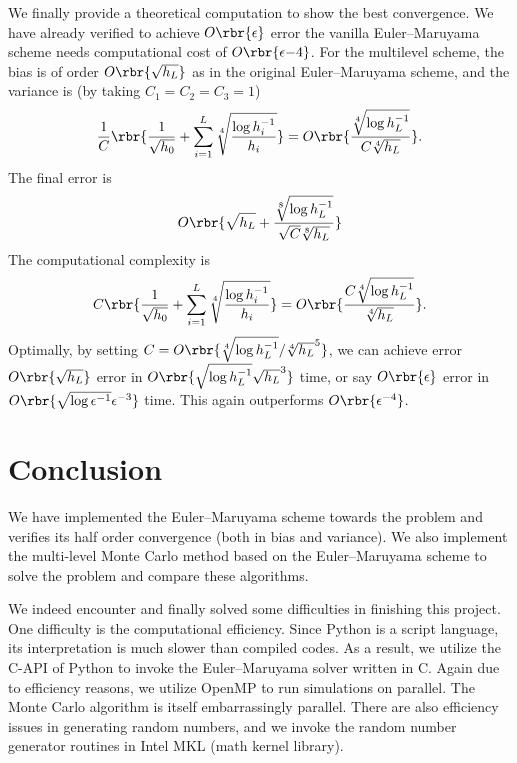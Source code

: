 \documentclass[english, nochinese]{pnote}
\begin{document}
We finally provide a theoretical computation to show the best convergence. We have already verified to achieve $ O \rbr{\epsilon} $ error the vanilla Euler--Maruyama scheme needs computational cost of $ O \rbr{\epsilon{-4}} $. For the multilevel scheme, the bias is of order $ O \rbr{\sqrt{h_L}} $ as in the original Euler--Maruyama scheme, and the variance is (by taking $ C_1 = C_2 = C_3 = 1 $)
\begin{equation}
\frac{1}{C} \rbr{ \frac{1}{\sqrt{h_0}} + \sum_{ i = 1 }^L \sqrt[4]{\frac{ \log h_i^{-1} }{h_i}} } = O \rbr{ \frac{\sqrt[4]{ \log h_L^{-1} }}{ C \sqrt[4]{h_L} } }.
\end{equation}
The final error is
\begin{equation}
O \rbr{ \sqrt{h_L} + \frac{\sqrt[8]{ \log h_L^{-1} }}{ \sqrt{C} \sqrt[8]{h_L} } }
\end{equation}
The computational complexity is
\begin{equation}
C \rbr{ \frac{1}{\sqrt{h_0}} + \sum_{ i = 1 }^L \sqrt[4]{\frac{ \log h_i^{-1} }{h_i}} } = O \rbr{ \frac{ C \sqrt[4]{ \log h_L^{-1} } }{\sqrt[4]{h_L}} }.
\end{equation}
Optimally, by setting $ C = O \rbr{ \sqrt[4]{ \log h_L^{-1} } / \sqrt[4]{h_L}^5 } $, we can achieve error $ O \rbr{\sqrt{h_L}} $ error in $ O \rbr{ \sqrt{ \log h_L^{-1} }{\sqrt{h_L}^3}} $ time, or say $ O \rbr{\epsilon} $ error in $ O \rbr{ \sqrt{ \log \epsilon^{-1} } \epsilon^{-3} } $ time. This again outperforms $ O \rbr{\epsilon^{-4}} $.

\section{Conclusion}

We have implemented the Euler--Maruyama scheme towards the problem and verifies its half order convergence (both in bias and variance). We also implement the multi-level Monte Carlo method based on the Euler--Maruyama scheme to solve the problem and compare these algorithms.

We indeed encounter and finally solved some difficulties in finishing this project. One difficulty is the computational efficiency. Since Python is a script language, its interpretation is much slower than compiled codes. As a result, we utilize the C-API of Python to invoke the Euler--Maruyama solver written in C. Again due to efficiency reasons, we utilize OpenMP to run simulations on parallel. The Monte Carlo algorithm is itself embarrassingly parallel. There are also efficiency issues in generating random numbers, and we invoke the random number generator routines in Intel MKL (math kernel library).
\end{document}
